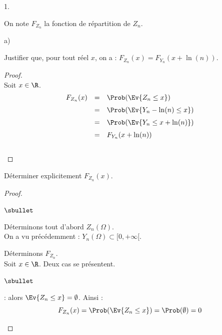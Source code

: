 \documentclass[11pt]{article}%
\begin{document}
\begin{noliste}{1.}


\item On note $F_{Z_{n}}$ la fonction de répartition de $Z_{n}$.
  \begin{noliste}{a)}
    \setlength{\itemsep}{2mm}
  \item Justifier que, pour tout réel $x$, on a : $F_{Z_{n}}(x) =
    F_{Y_{n}}\left(x + \ln(n)\right)$.
    
    \begin{proof}~\\
      Soit $x\in\R$.
      \[
       \begin{array}{rcl}
        F_{Z_n}(x) & = & \Prob(\Ev{Z_n \leq x})
        \\[.2cm]
        & = & \Prob(\Ev{Y_n - \ln(n) \leq x})
        \\[.2cm]
        & = & \Prob(\Ev{Y_n \leq x+\ln(n)})
        \\[.2cm]
        & = & F_{Y_n}(x+\ln(n))
       \end{array}
      \]
      ~\\[-1cm]
    \end{proof}

  \item Déterminer explicitement $F_{Z_{n}}(x)$.
  
  \begin{proof}~%
    \begin{noliste}{$\sbullet$}
    \item Déterminons tout d'abord $Z_n(\Omega)$.\\
      On a vu précédemment : $Y_n(\Omega) \subset [0, +\infty[$.%
      \conc{Comme $Z_n = Y_n - \ln(n)$, on en déduit que $Z_n(\Omega)
        \subset [-\ln(n), +\infty[$}~
    \end{noliste}
    Déterminons $F_{Z_n}$.\\
    Soit $x\in\R$. Deux cas se présentent.
    \begin{noliste}{$\sbullet$}
    \item {} : alors $\Ev{Z_n \leq x} =
      \emptyset$. Ainsi :
      \[
      F_{Z_n}(x) = \Prob(\Ev{Z_n \leq x}) = \Prob(\emptyset) = 0
      \]
      

\end{noliste}
\end{proof}
\end{noliste}
\end{noliste}
\end{document}
